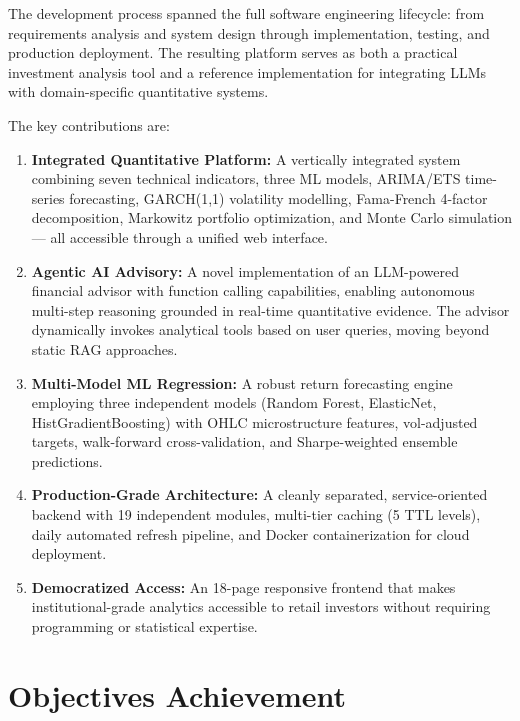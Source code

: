\documentclass[12pt, a4paper, oneside]{report}
\begin{document}
The development process spanned the full software engineering lifecycle: from requirements analysis and system design through implementation, testing, and production deployment. The resulting platform serves as both a practical investment analysis tool and a reference implementation for integrating LLMs with domain-specific quantitative systems.

The key contributions are:

\begin{enumerate}[nosep]
    \item \textbf{Integrated Quantitative Platform:} A vertically integrated system combining seven technical indicators, three ML models, ARIMA/ETS time-series forecasting, GARCH(1,1) volatility modelling, Fama-French 4-factor decomposition, Markowitz portfolio optimization, and Monte Carlo simulation --- all accessible through a unified web interface.

    \item \textbf{Agentic AI Advisory:} A novel implementation of an LLM-powered financial advisor with function calling capabilities, enabling autonomous multi-step reasoning grounded in real-time quantitative evidence. The advisor dynamically invokes analytical tools based on user queries, moving beyond static RAG approaches.

    \item \textbf{Multi-Model ML Regression:} A robust return forecasting engine employing three independent models (Random Forest, ElasticNet, HistGradientBoosting) with OHLC microstructure features, vol-adjusted targets, walk-forward cross-validation, and Sharpe-weighted ensemble predictions.

    \item \textbf{Production-Grade Architecture:} A cleanly separated, service-oriented backend with 19 independent modules, multi-tier caching (5 TTL levels), daily automated refresh pipeline, and Docker containerization for cloud deployment.

    \item \textbf{Democratized Access:} An 18-page responsive frontend that makes institutional-grade analytics accessible to retail investors without requiring programming or statistical expertise.
\end{enumerate}

\section{Objectives Achievement}
\label{sec:objectives_achievement}
\end{document}
